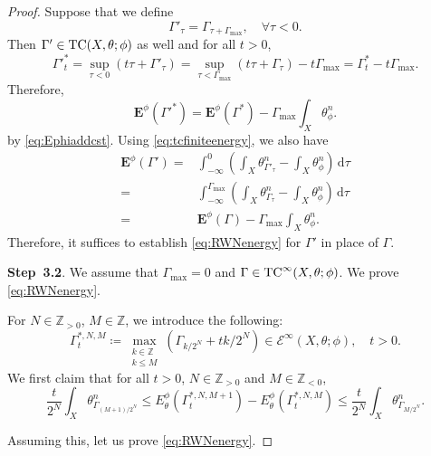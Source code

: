\begin{proof}
    Suppose that we define
    \[
    \Gamma'_{\tau}=\Gamma_{\tau+\Gamma_{\max}},\quad \forall \tau<0.
    \]
    Then $\Gamma'\in \mathrm{TC}(X,\theta;\phi)$ as well and for all $t>0$,
    \[
    \Gamma'^*_t=\sup_{\tau<0} \left( t\tau+\Gamma'_{\tau} \right)=\sup_{\tau<\Gamma_{\max}} \left( t\tau+\Gamma_{\tau} \right)-t\Gamma_{\max}=\Gamma^*_t-t\Gamma_{\max}.
    \]
    Therefore,
    \[
    \mathbf{E}^{\phi}\left(\Gamma'^*\right)=\mathbf{E}^{\phi}\left(\Gamma^*\right)-\Gamma_{\max}\int_X \theta_{\phi}^n.
    \]
    by \eqref{eq:Ephiaddcst}. Using \eqref{eq:tcfiniteenergy}, we also have
    \[
    \begin{aligned}
    \mathbf{E}^{\phi}(\Gamma')=&\int_{-\infty}^0 \left( \int_X \theta_{\Gamma'_{\tau}}^n-\int_X \theta_{\phi}^n \right)\,\mathrm{d}\tau\\
    =& \int_{-\infty}^{\Gamma_{\max}}\left( \int_X \theta_{\Gamma_{\tau}}^n-\int_X \theta_{\phi}^n \right)\,\mathrm{d}\tau\\
    =& \mathbf{E}^{\phi}(\Gamma)-\Gamma_{\max}\int_X \theta_{\phi}^n.
    \end{aligned}
    \]
    Therefore, it suffices to establish \eqref{eq:RWNenergy} for $\Gamma'$ in place of $\Gamma$.

    \textbf{Step~3.2}. We assume that $\Gamma_{\max}=0$ and $\Gamma\in \mathrm{TC}^{\infty}(X,\theta;\phi)$. We prove \eqref{eq:RWNenergy}.

    For $N\in \mathbb{Z}_{>0}$, $M \in \mathbb{Z}$, we introduce the following:
    \[
        \Gamma^{*,N,M}_t \coloneqq \max_{\substack{k \in \mathbb{Z} \\ k \leq M}} \left(\Gamma_{k/2^N} +  tk/2^N\right)\in \mathcal{E}^{\infty}(X,\theta;\phi),\quad t>0.
    \]
    We first claim that for all $t>0$, $N\in \mathbb{Z}_{>0}$ and $M\in \mathbb{Z}_{<0}$,
    \begin{equation}\label{eq:diff_eq_I}
        \frac{t}{2^N} \int_X \theta^n_{\Gamma_{(M+1)/2^N}}\leq E_{\theta}^{\phi}\left(\Gamma_t^{*,N,M+1}\right)-E_{\theta}^{\phi}\left(\Gamma_t^{*,N,M}\right)\leq \frac{t}{2^N} \int_X \theta^n_{\Gamma_{M/2^N}}.
    \end{equation}

    Assuming this, let us prove \eqref{eq:RWNenergy}.


\end{proof}

